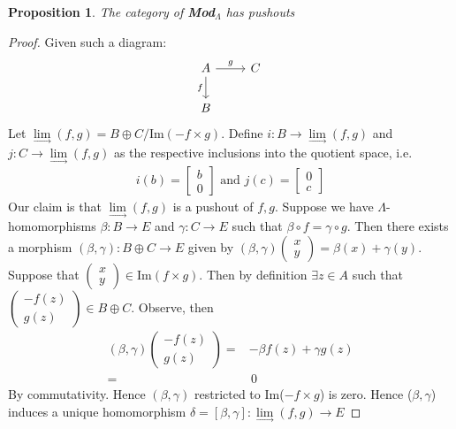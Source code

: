 \documentclass[12pt]{book}
\newtheorem{proposition}[theorem]{Proposition}
\theoremstyle{definition}
\begin{document}
\begin{proposition}
    The category of \textbf{Mod}$_\Lambda$ has pushouts
\end{proposition}
\begin{proof}
    Given such a diagram:
    \[
    \begin{tikzcd}
    A \arrow[d,"f"'] \arrow[r,"g"] & C \\
    B  
    \end{tikzcd}
    \]
    Let $\lim\limits_{\to}(f,g) = B \oplus C/ {\text{Im}(-f \times g)}$. Define $i : B \to \lim\limits_{\to}(f,g)$ and $j : C \to \lim\limits_{\to}(f,g)$ as the respective inclusions into the quotient space, i.e.
    \begin{align*}
        i(b) = \begin{bmatrix} b \\ 0 \end{bmatrix} \text{ and } j(c) = \begin{bmatrix} 0 \\ c \end{bmatrix}
    \end{align*}
    Our claim is that $\lim\limits_{\to}(f,g)$ is a pushout of $f,g$. Suppose we have $\Lambda$-homomorphisms $\beta: B \to E$ and $\gamma: C \to E$ such that $\beta \circ f = \gamma \circ g$. Then there exists a morphism $(\beta, \gamma) : B \oplus C \to E$ given by $(\beta, \gamma) \begin{pmatrix} x \\ y \end{pmatrix} = \beta(x) + \gamma(y)$. Suppose that $\begin{pmatrix} x \\ y \end{pmatrix} \in \text{Im}(f \times g)$. Then by definition $\exists z \in A$ such that $\begin{pmatrix} -f(z) \\ g(z) \end{pmatrix} \in B \oplus C$. Observe, then 
    \begin{align*}
        (\beta, \gamma) \begin{pmatrix} -f(z) \\ g(z) \end{pmatrix} =& -\beta f(z) + \gamma g (z)\\
                                                                    =& \, 0
    \end{align*}
    By commutativity. Hence $(\beta, \gamma)$ restricted to Im($-f \times g$) is zero. Hence ($\beta, \gamma$) induces a unique homomorphism $\delta = [\beta, \gamma] : \lim\limits_{\to}(f,g) \to E$
\end{proof}
\end{document}
